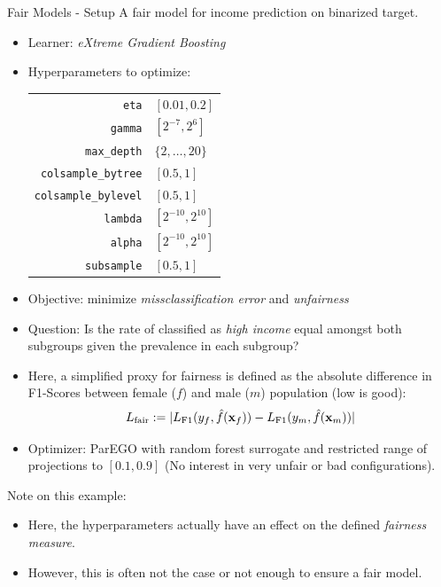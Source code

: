 \begin{frame}[allowframebreaks]{Fair Models - Setup}
  A fair model for income prediction on binarized target.
\begin{itemize}
  \item Learner: \emph{eXtreme Gradient Boosting}
  \item Hyperparameters to optimize: \\
  \begin{tabular}{rl}
    \texttt{eta} & $[0.01,0.2]$ \\
    \texttt{gamma} & $[2^{-7},2^6]$ \\
    \texttt{max\_depth} & $\{2, \ldots, 20\}$ \\
    \texttt{colsample\_bytree} & $[0.5,1]$ \\
    \texttt{colsample\_bylevel} & $[0.5,1]$ \\
    \texttt{lambda} & $[2^{-10},2^{10}]$ \\
    \texttt{alpha} & $[2^{-10},2^{10}]$ \\
    \texttt{subsample} & $[0.5,1]$ \\
  \end{tabular}
  \item Objective: minimize \emph{missclassification error} and \emph{unfairness}
  \item Question: Is the rate of classified as \emph{high income} equal amongst both subgroups given the prevalence in each subgroup?
  \item Here, a simplified proxy for fairness is defined as the absolute difference in F1-Scores between female ($f$) and male ($m$) population (low is good):
  \[
  L_{\text{fair}} := |L_{\text{F1}}(y_f,\hat{f}(\mathbf{x}_f)) - L_{\text{F1}}(y_m,\hat{f}(\mathbf{x}_m))|
  \]
  \item Optimizer: ParEGO with random forest surrogate and restricted range of projections to $[0.1, 0.9]$ (No interest in very unfair or bad configurations).
\end{itemize}
\vspace{1em}
Note on this example:
\begin{itemize}
  \item Here, the hyperparameters actually have an effect on the defined \emph{fairness measure}.
  \item However, this is often not the case or not enough to ensure a fair model.
\end{itemize}

\end{frame}


